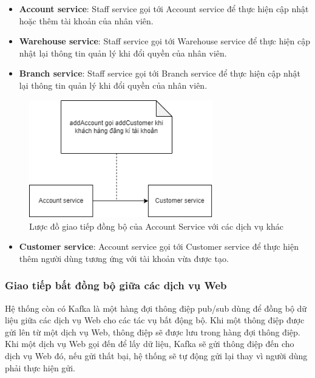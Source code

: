 \begin{itemize}
	\item \textbf{Account service}: Staff service gọi tới Account service để thực hiện cập nhật hoặc thêm tài khoản của nhân viên.
	\item \textbf{Warehouse service}: Staff service gọi tới Warehouse service để thực hiện cập nhật lại thông tin quản lý khi đổi quyền của nhân viên.
	\item \textbf{Branch service}: Staff service gọi tới Branch service để thực hiện cập nhật lại thông tin quản lý khi đổi quyền của nhân viên.
\end{itemize}

\begin{figure}[!htp]
	\centering
	\includegraphics[width=8cm]{img/Architecture/service/account-call.png}
	\newline
	\caption{Lược đồ giao tiếp đồng bộ của Account Service với các dịch vụ khác}
\end{figure}

\begin{itemize}
	\item \textbf{Customer service}: Account service gọi tới Customer service để thực hiện thêm người dùng tương ứng với tài khoản vừa được tạo.
\end{itemize}

\subsubsection{Giao tiếp bất đồng bộ giữa các dịch vụ Web}

Hệ thống còn có Kafka là một hàng đợi thông điệp pub/sub dùng để đồng bộ dữ liệu giữa các dịch vụ Web cho các tác vụ bất động bộ. Khi một thông điệp được gửi lên từ một dịch vụ Web, thông điệp sẽ được lưu trong hàng đợi thông điệp. Khi một dịch vụ Web gọi đến để lấy dữ liệu, Kafka sẽ gửi thông điệp đến cho dịch vụ Web đó, nếu gửi thất bại, hệ thống sẽ tự động gửi lại thay vì người dùng phải thực hiện gửi.

